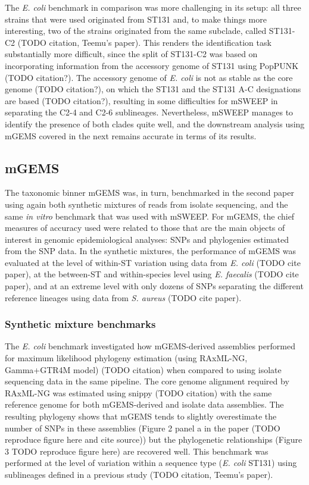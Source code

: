 \documentclass[officiallayout]{tktla}
\begin{document}
The \textit{E. coli} benchmark in comparison was more challenging in
its setup: all three strains that were used originated from ST131 and,
to make things more interesting, two of the strains originated from
the same subclade, called ST131-C2 (TODO citation, Teemu's
paper). This renders the identification task substantially more
difficult, since the split of ST131-C2 was based on incorporating
information from the accessory genome of ST131 using PopPUNK (TODO
citation?). The accessory genome of \textit{E. coli} is not as stable
as the core genome (TODO citation?), on which the ST131 and the ST131
A-C designations are based (TODO citation?), resulting in some
difficulties for mSWEEP in separating the C2-4 and C2-6
sublineages. Nevertheless, mSWEEP manages to identify the presence of
both clades quite well, and the downstream analysis using mGEMS
covered in the next remains accurate in terms of its results.

\subsection{mGEMS}
\label{mgems-performance-benchmark}

The taxonomic binner mGEMS was, in turn, benchmarked in the second
paper using again both synthetic mixtures of reads from isolate
sequencing, and the same \textit{in vitro} benchmark that was used
with mSWEEP. For mGEMS, the chief measures of accuracy used were
related to those that are the main objects of interest in genomic
epidemiological analyses: SNPs and phylogenies estimated from the SNP
data. In the synthetic mixtures, the performance of mGEMS was
evaluated at the level of within-ST variation using data from
\textit{E. coli} (TODO cite paper), at the between-ST and
within-species level using \textit{E. faecalis} (TODO cite paper), and
at an extreme level with only dozens of SNPs separating the different
reference lineages using data from \textit{S. aureus} (TODO cite
paper).

\subsubsection{Synthetic mixture benchmarks}

The \textit{E. coli} benchmark investigated how mGEMS-derived
assemblies performed for maximum likelihood phylogeny estimation
(using RAxML-NG, Gamma+GTR4M model) (TODO citation) when compared to
using isolate sequencing data in the same pipeline. The core genome
alignment required by RAxML-NG was estimated using snippy (TODO
citation) with the same reference genome for both mGEMS-derived and
isolate data assemblies. The resulting phylogeny shows that mGEMS
tends to slightly overestimate the number of SNPs in these assemblies
(Figure 2 panel a in the paper (TODO reproduce figure here and cite
source)) but the phylogenetic relationships (Figure 3 TODO reproduce
figure here) are recovered well. This benchmark was performed at the
level of variation within a sequence type (\textit{E. coli} ST131)
using sublineages defined in a previous study (TODO citation, Teemu's
paper).
\end{document}
